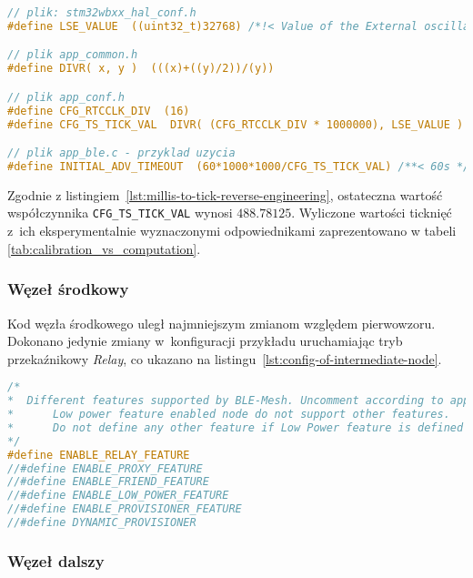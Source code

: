 \begin{lstlisting}[language=C,
    caption={Ścieżka inżynierii wstecznej w celu znalezienia współczynnika umożliwiającego konwersję milisekund do ticków},
    label={lst:millis-to-tick-reverse-engineering}]
// plik: stm32wbxx_hal_conf.h
#define LSE_VALUE  ((uint32_t)32768) /*!< Value of the External oscillator in Hz*/

// plik app_common.h
#define DIVR( x, y )  (((x)+((y)/2))/(y))

// plik app_conf.h
#define CFG_RTCCLK_DIV  (16)
#define CFG_TS_TICK_VAL  DIVR( (CFG_RTCCLK_DIV * 1000000), LSE_VALUE )

// plik app_ble.c - przyklad uzycia
#define INITIAL_ADV_TIMEOUT  (60*1000*1000/CFG_TS_TICK_VAL) /**< 60s */
\end{lstlisting}

Zgodnie z listingiem~\ref{lst:millis-to-tick-reverse-engineering}, ostateczna wartość współczynnika \texttt{CFG\_TS\_TICK\_VAL}
wynosi $488.78125$. Wyliczone wartości ticknięć z~ich eksperymentalnie wyznaczonymi odpowiednikami zaprezentowano w tabeli
\ref{tab:calibration_vs_computation}.

\subsubsection{Węzeł środkowy}

Kod węzła środkowego uległ najmniejszym zmianom względem pierwowzoru. Dokonano jedynie zmiany w~konfiguracji przykładu
uruchamiając tryb przekaźnikowy \textit{Relay}, co ukazano na listingu~\ref{lst:config-of-intermediate-node}.

\begin{lstlisting}[language=C,
    caption={Konfiguracja węzła środkowego},
    label={lst:config-of-intermediate-node}]
/*
*  Different features supported by BLE-Mesh. Uncomment according to application.
*      Low power feature enabled node do not support other features. 
*      Do not define any other feature if Low Power feature is defined
*/
#define ENABLE_RELAY_FEATURE
//#define ENABLE_PROXY_FEATURE
//#define ENABLE_FRIEND_FEATURE
//#define ENABLE_LOW_POWER_FEATURE
//#define ENABLE_PROVISIONER_FEATURE
//#define DYNAMIC_PROVISIONER
\end{lstlisting}

\subsubsection{Węzeł dalszy}

